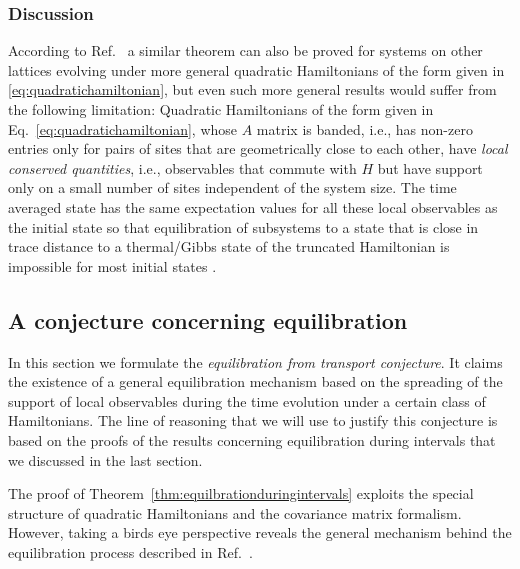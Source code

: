 \documentclass[a4paper,12pt,listof=totoc,index=totoc,bibliography=totoc,headsepline=false,headings=normal,BCOR16.153846mm,DIV12,headinclude,twoside,cleardoublepage=empty,numbers=noenddot,final]{scrreprt}
\theoremstyle{mystyle}
\numberwithin{equation}{section}
\numberwithin{figure}{section}
\numberwithin{lemma}{section}
\numberwithin{theorem}{section}
\numberwithin{corollary}{section}
\numberwithin{definition}{section}
\numberwithin{conjecture}{section}
\numberwithin{observation}{section}
\newcommand{\+}{\mkern2mu}
\newcommand{\texteqref}[1]{Eq.~\eqref{#1}}
\renewcommand{\H}{H}
\DeclareMathOperator{\1}{\mathds{1}}
\begin{document}
\subsubsection*{Discussion}
%
According to Ref.~\cite{cramer10_1} a similar theorem can also be proved for systems on other lattices evolving under more general quadratic Hamiltonians of the form given in \eqref{eq:quadratichamiltonian}, but even such more general results would suffer from the following limitation:
Quadratic Hamiltonians of the form given in \texteqref{eq:quadratichamiltonian}, whose $A$ matrix is banded, i.e., has non-zero entries only for pairs of sites that are geometrically close to each other, have \emph{local conserved quantities}, i.e., observables that commute with $\H$ but have support only on a small number of sites independent of the system size.
The time averaged state has the same expectation values for all these local observables as the initial state so that equilibration of subsystems to a state that is close in trace distance to a thermal/Gibbs state of the truncated Hamiltonian is impossible for most initial states \cite{Lanford1972,cramer10_1}.


\subsection{A conjecture concerning equilibration}
\label{sec:conjectureconcerningequilibration}
%
In this section we formulate the \emph{equilibration from transport conjecture}.
It claims the existence of a general equilibration mechanism based on the spreading of the support of local observables during the time evolution under a certain class of Hamiltonians.
The line of reasoning that we will use to justify this conjecture is based on the proofs of the results concerning equilibration during intervals that we discussed in the last section.

The proof of Theorem~\ref{thm:equilbrationduringintervals} exploits the special structure of quadratic Hamiltonians and the covariance matrix formalism.
However, taking a birds eye perspective reveals the general mechanism behind the equilibration process described in Ref.~\cite{cramer10_1}.
\end{document}
